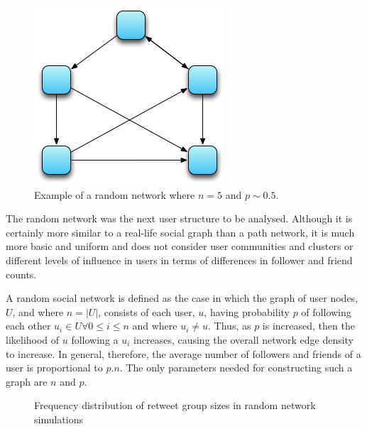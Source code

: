 \begin{figure}[h]
\centering
\includegraphics[scale=0.8]{4.Chapter2/Media/random_network.png} 
\caption{Example of a random network where $n = 5$ and $p \sim 0.5$.}
\label{fig:path_network}
\end{figure}


The random network was the next user structure to be analysed. Although it is certainly more similar to a real-life social graph than a path network, it is much more basic and uniform and does not consider user communities and clusters or different levels of influence in users in terms of differences in follower and friend counts.

A random social network is defined as the case in which the graph of user nodes, $U$, and where $n = |U|$, consists of each user, $u$, having probability $p$ of following each other $u_i \in U \forall 0 \leq i \leq n$ and where $u_i \neq u$. Thus, as $p$ is increased, then the likelihood of $u$ following a $u_i$ increases, causing the overall network edge density to increase. In general, therefore, the average number of followers and friends of a user is proportional to $p.n$. The only parameters needed for constructing such a graph are $n$ and $p$.

\begin{figure}[h]
\centering
{}
\caption{Frequency distribution of retweet group sizes in random network simulations}
\label{fig:random}
\end{figure}

